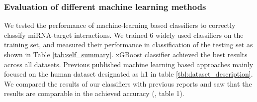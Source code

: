 \documentclass{bmcart}
\begin{document}
\subsubsection*{Evaluation of different machine learning methods} \label{sec:evaluation_different_ML}
We tested the performance of machine-learning based classifiers to correctly classify miRNA-target interactions. We trained 6 widely used classifiers on the training set, and measured their performance in classification of the testing set as shown in Table \ref{tab:self_summary}. xGBoost classifier achieved the best results across all datasets. 
Previous published machine learning based approaches mainly focused on the human dataset designated as h1 in table \ref{tbl:dataset_description}. We compared the results of our classifiers with previous reports and saw that the results are comparable in the achieved accuracy (, table 1). 
\end{document}
